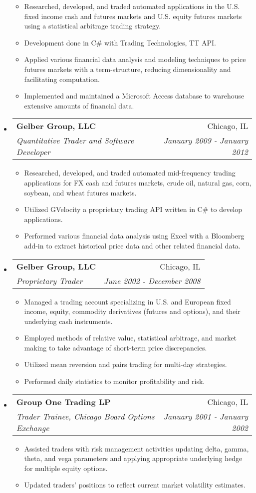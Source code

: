 \documentclass[letterpaper,10pt]{article}
\makeatletter
\newcommand{\resitem}[1]{\item #1 \vspace{-2pt}}
\newcommand{\ressubheading}[4]{
\begin{tabular*}{7.0in}{l@{\extracolsep{\fill}}r}
		\textbf{#1} & #2 \\
		\textit{#3} & \textit{#4} \\
\end{tabular*}\vspace{-6pt}}
\makeatother
\begin{document}
\begin{itemize}
\begin{itemize}
		\resitem{Researched, developed, and traded automated applications in the U.S. fixed income cash and 
   futures markets and U.S. equity futures markets using a statistical arbitrage trading strategy.}
		\resitem{Development done in C\# with Trading Technologies, TT API.}
		\resitem{Applied various financial data analysis and modeling techniques to price futures markets with 
   a term-structure, reducing dimensionality and facilitating computation.}
        \resitem{Implemented and maintained a Microsoft Access database to warehouse extensive amounts of financial data.}
	\end{itemize}
\item
	\ressubheading{Gelber Group, LLC}{Chicago, IL}{Quantitative Trader and Software Developer}{January 2009 - January 2012}
	\begin{itemize}
		\resitem{Researched, developed, and traded automated mid-frequency trading applications for FX cash and 
   futures markets, crude oil, natural gas, corn, soybean, and wheat futures markets.}
		\resitem{Utilized GVelocity a proprietary trading API written in C\# to develop applications.}
		\resitem{Performed various financial data analysis using Excel with a Bloomberg add-in to extract historical price data and other related financial data.}
	\end{itemize}

\item
	\ressubheading{Gelber Group, LLC}{Chicago, IL}{Proprietary Trader}{June 2002 - December 2008}
	\begin{itemize}
		\resitem{Managed a trading account specializing in U.S. and European fixed income, equity, commodity
   derivatives (futures and options), and their underlying cash instruments.}
		\resitem{Employed methods of relative value, statistical arbitrage, and market making to take advantage 
   of short-term price discrepancies.}
		\resitem{Utilized mean reversion and pairs trading for multi-day strategies.}
		\resitem{Performed daily statistics to monitor profitability and risk. }
	\end{itemize}

\item
	\ressubheading{Group One Trading LP}{Chicago, IL}{Trader Trainee, Chicago Board Options Exchange}{January 2001 - January 2002}
	\begin{itemize}
		\resitem{Assisted traders with risk management activities updating delta, gamma, theta, and vega
  parameters and applying appropriate underlying hedge for multiple equity options.}
		\resitem{Updated traders’ positions to reflect current market volatility estimates.}
	\end{itemize}

\end{itemize}
\end{document}
